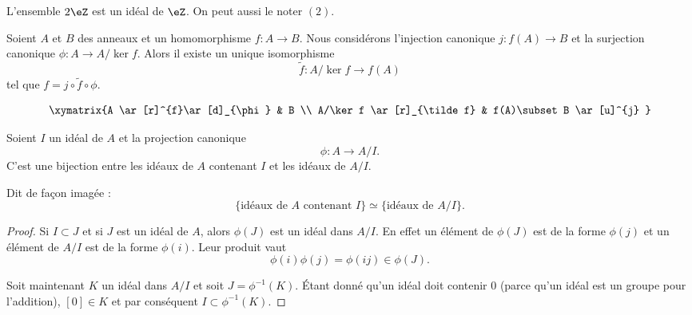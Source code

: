 \begin{example}
	L'ensemble \( 2\eZ\) est un idéal de \( \eZ\). On peut aussi le noter \( (2) \).
\end{example}

\begin{proposition}   \label{PROPooJALPooHFIObB}
	Soient \( A\) et \( B\) des anneaux et un homomorphisme \( f\colon A\to B\). Nous considérons l'injection canonique \( j\colon f(A)\to B\) et la surjection canonique \( \phi\colon A\to A/\ker f\). Alors il existe un unique isomorphisme
	\begin{equation}
		\tilde f \colon A/\ker f\to f(A)
	\end{equation}
	tel que \( f=j\circ\tilde f\circ\phi\).

	\begin{equation}
		\xymatrix{%
			A \ar[r]^{f}\ar[d]_{\phi}       &   B                         \\
			A/\ker f    \ar[r]_{\tilde f}   &   f(A)\subset B \ar[u]^{j}
		}
	\end{equation}
\end{proposition}

\begin{proposition}     \label{PropIJJIdsousphi}
	Soient \( I\) un idéal de \( A\) et la projection canonique
	\begin{equation}
		\phi\colon A\to A/I.
	\end{equation}
	C'est une bijection entre les idéaux de \( A\) contenant \( I\) et les idéaux de \( A/I\).

	Dit de façon imagée :
	\begin{equation}        \label{EqKbrizu}
		\{ \text{idéaux de } A\text{ contenant } I\}\simeq\{ \text{idéaux de } A/I \}.
	\end{equation}
\end{proposition}

\begin{proof}
	Si \( I\subset J\) et si \( J \) est un idéal de \( A\), alors \( \phi(J)\) est un idéal dans \( A/I\). En effet un élément de \( \phi(J)\) est de la forme \( \phi(j)\) et un élément de \( A/I\) est de la forme \( \phi(i)\). Leur produit vaut
	\begin{equation}
		\phi(i)\phi(j)=\phi(ij)\in\phi(J).
	\end{equation}

	Soit maintenant \( K\) un idéal dans \( A/I\) et soit \( J=\phi^{-1}(K)\). Étant donné qu'un idéal doit contenir \( 0\) (parce qu'un idéal est un groupe pour l'addition), \( [0]\in K\) et par conséquent \( I\subset\phi^{-1}(K)\).
\end{proof}

